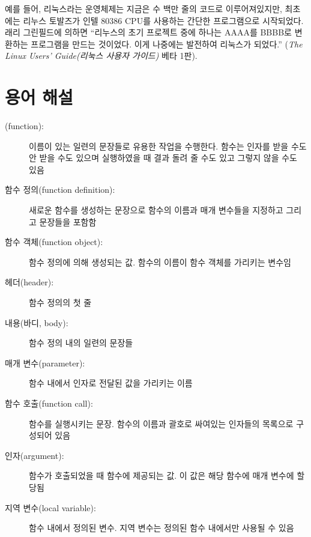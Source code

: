 \documentclass[10pt]{book}
\begin{document}
예를 들어, 리눅스라는 운영체제는 지금은 수 백만 줄의 코드로
이루어져있지만, 최초에는 리누스 토발즈가 인텔 80386 CPU를 사용하는
간단한 프로그램으로 시작되었다.  래리 그린필드에 의하면 ``리누스의 초기
프로젝트 중에 하나는 AAAA를 BBBB로 변환하는 프로그램을 만드는
것이었다.  이게 나중에는 발전하여 리눅스가 되었다.''  ({\em The Linux
  Users' Guide(리눅스 사용자 가이드)} 베타 1판).


\section{용어 해설}

\begin{description}

\item[(function):] 이름이 있는 일련의 문장들로 유용한 작업을 수행한다.
  함수는 인자를 받을 수도 안 받을 수도 있으며 실행하였을 때 결과 돌려
  줄 수도 있고 그렇지 않을 수도 있음

\item[함수 정의(function definition):]  새로운 함수를 생성하는 문장으로 함수의 이름과 매개 변수들을 지정하고 그리고 문장들을 포함함

\item[함수 객체(function object):] 함수 정의에 의해 생성되는 값.
  함수의 이름이 함수 객체를 가리키는 변수임 

\item[헤더(header):] 함수 정의의 첫 줄 

\item[내용(바디, body):] 함수 정의 내의 일련의 문장들

\item[매개 변수(parameter):] 함수 내에서 인자로 전달된 값을 가리키는 이름

\item[함수 호출(function call):] 함수를 실행시키는 문장.  함수의 이름과
  괄호로 싸여있는 인자들의 목록으로 구성되어 있음

\item[인자(argument):] 함수가 호출되었을 때 함수에 제공되는 값.  이
  값은 해당 함수에 매개 변수에 할당됨

\item[지역 변수(local variable):] 함수 내에서 정의된 변수.  지역 변수는
  정의된 함수 내에서만 사용될 수 있음


\end{description}
\end{document}
